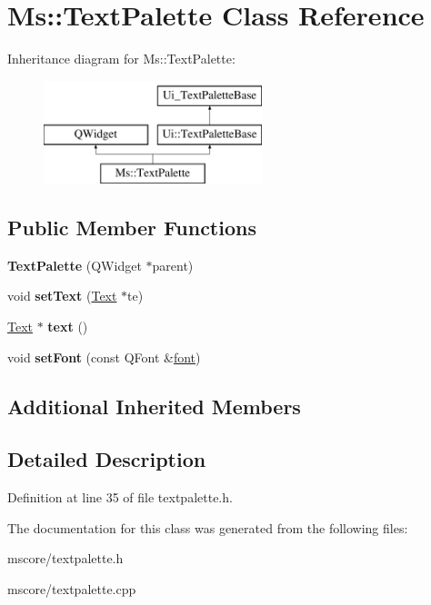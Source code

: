 \hypertarget{class_ms_1_1_text_palette}{}\section{Ms\+:\+:Text\+Palette Class Reference}
\label{class_ms_1_1_text_palette}
Inheritance diagram for Ms\+:\+:Text\+Palette\+:\begin{figure}[H]
\begin{center}
\leavevmode
\includegraphics[height=3.000000cm]{class_ms_1_1_text_palette}
\end{center}
\end{figure}
\subsection*{Public Member Functions}
\begin{DoxyCompactItemize}
\item 
\mbox{\label{class_ms_1_1_text_palette_a7d5caa75189548df297dd5a38e193b7c}} 
{\bfseries Text\+Palette} (Q\+Widget $\ast$parent)
\item 
\mbox{\label{class_ms_1_1_text_palette_a51b757dfaf57ec94a7783d0fa1d1aa11}} 
void {\bfseries set\+Text} (\hyperlink{class_ms_1_1_text}{Text} $\ast$te)
\item 
\mbox{\label{class_ms_1_1_text_palette_aa1a049f147f5d3ffd237af84ba34077d}} 
\hyperlink{class_ms_1_1_text}{Text} $\ast$ {\bfseries text} ()
\item 
\mbox{\label{class_ms_1_1_text_palette_a9c9b0cdab8c219949d115a13ab1eac8e}} 
void {\bfseries set\+Font} (const Q\+Font \&\hyperlink{structfont}{font})
\end{DoxyCompactItemize}
\subsection*{Additional Inherited Members}


\subsection{Detailed Description}


Definition at line 35 of file textpalette.\+h.



The documentation for this class was generated from the following files\+:\begin{DoxyCompactItemize}
\item 
mscore/textpalette.\+h\item 
mscore/textpalette.\+cpp\end{DoxyCompactItemize}
